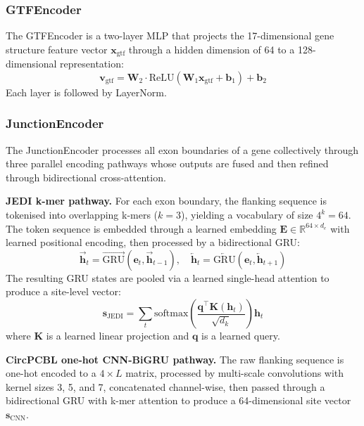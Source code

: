 \documentclass[12pt]{article}
\begin{document}
\subsubsection{GTFEncoder}

The GTFEncoder is a two-layer MLP that projects the 17-dimensional gene structure feature vector $\mathbf{x}_\text{gtf}$ through a hidden dimension of 64 to a 128-dimensional representation:
\begin{equation}
\mathbf{v}_\text{gtf} = \mathbf{W}_2 \cdot \text{ReLU}(\mathbf{W}_1 \mathbf{x}_\text{gtf} + \mathbf{b}_1) + \mathbf{b}_2
\end{equation}
Each layer is followed by LayerNorm.

\subsubsection{JunctionEncoder}\label{sec:junctionencoder}

The JunctionEncoder processes all exon boundaries of a gene collectively through three parallel encoding pathways whose outputs are fused and then refined through bidirectional cross-attention.

\textbf{JEDI k-mer pathway.} For each exon boundary, the flanking sequence is tokenised into overlapping k-mers ($k=3$), yielding a vocabulary of size $4^k = 64$. The token sequence is embedded through a learned embedding $\mathbf{E} \in \mathbb{R}^{64 \times d_e}$ with learned positional encoding, then processed by a bidirectional GRU:
\begin{equation}
\overrightarrow{\mathbf{h}}_t = \overrightarrow{\text{GRU}}(\mathbf{e}_t, \overrightarrow{\mathbf{h}}_{t-1}), \quad
\overleftarrow{\mathbf{h}}_t = \overleftarrow{\text{GRU}}(\mathbf{e}_t, \overleftarrow{\mathbf{h}}_{t+1})
\end{equation}
The resulting GRU states are pooled via a learned single-head attention to produce a site-level vector:
\begin{equation}
\mathbf{s}_\text{JEDI} = \sum_{t} \text{softmax}\left(\frac{\mathbf{q}^\top \mathbf{K}(\mathbf{h}_t)}{\sqrt{d_k}}\right) \mathbf{h}_t
\end{equation}
where $\mathbf{K}$ is a learned linear projection and $\mathbf{q}$ is a learned query.

\textbf{CircPCBL one-hot CNN-BiGRU pathway.} The raw flanking sequence is one-hot encoded to a $4 \times L$ matrix, processed by multi-scale convolutions with kernel sizes 3, 5, and 7, concatenated channel-wise, then passed through a bidirectional GRU with k-mer attention to produce a 64-dimensional site vector $\mathbf{s}_\text{CNN}$.
\end{document}
